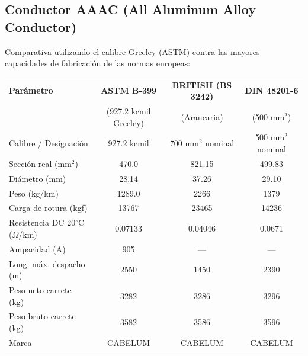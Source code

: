 \documentclass[12pt,a4paper]{article}
\begin{document}
\begin{landscape}
\subsection{Conductor AAAC (All Aluminum Alloy Conductor)}

Comparativa utilizando el calibre Greeley (ASTM) contra las mayores
capacidades de fabricación de las normas europeas:
\begin{center}
\begin{tabular}{p{4cm}c|c|c}
\toprule
\textbf{Parámetro} & \textbf{ASTM B-399} & \textbf{BRITISH (BS 3242)} & \textbf{DIN 48201-6} \\
& (927.2 kcmil Greeley) & (Araucaria) & (500 mm$^2$) \\
\midrule
Calibre / Designación & 927.2 kcmil & 700 mm$^2$ nominal & 500 mm$^2$ nominal \\
\midrule
Sección real (mm$^2$) & 470.0 & 821.15 & 499.83 \\
\midrule
Diámetro (mm) & 28.14 & 37.26 & 29.10 \\
\midrule
Peso (kg/km) & 1289.0 & 2266 & 1379 \\
\midrule
Carga de rotura (kgf) & 13767 & 23465 & 14236 \\
\midrule
Resistencia DC 20$^\circ$C ($\Omega$/km) & 0.07133 & 0.04046 & 0.0671 \\
\midrule
Ampacidad (A) & 905 & --- & --- \\
\midrule
Long. máx. despacho (m) & 2550 & 1450 & 2390 \\
\midrule
Peso neto carrete (kg) & 3282 & 3286 & 3296 \\
\midrule
Peso bruto carrete (kg) & 3582 & 3586 & 3596 \\
\midrule
Marca & CABELUM & CABELUM & CABELUM \\
\bottomrule
\end{tabular}
\end{center}
\end{landscape}
\end{document}
